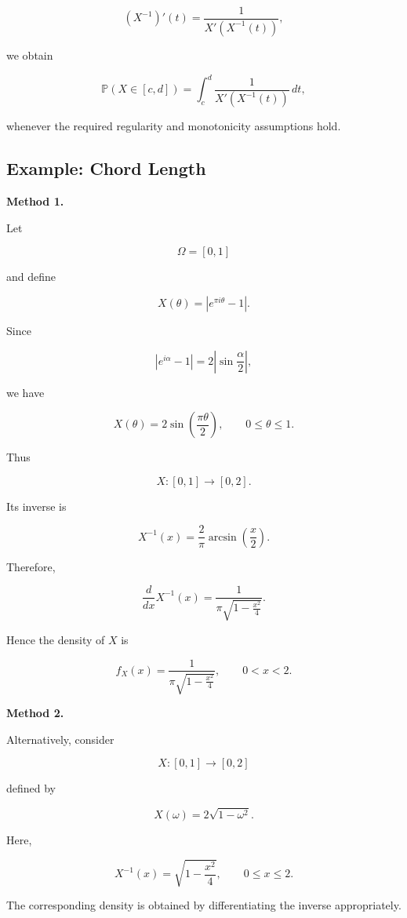 \[
(X^{-1})'(t)
=
\frac{1}{X'(X^{-1}(t))},
\]

we obtain

\[
\mathbb{P}(X\in[c,d])
=
\int_c^d
\frac{1}
{X'(X^{-1}(t))}
\,dt,
\]

whenever the required regularity and monotonicity assumptions hold.

\subsection{Example: Chord Length}

\textbf{Method 1.}

Let

\[
\Omega=[0,1]
\]

and define

\[
X(\theta)
=
\left|
e^{\pi i\theta}-1
\right|.
\]

Since

\[
\left|e^{i\alpha}-1\right|
=
2\left|\sin\frac{\alpha}{2}\right|,
\]

we have

\[
X(\theta)
=
2\sin\left(\frac{\pi\theta}{2}\right),
\qquad
0\leq\theta\leq1.
\]

Thus

\[
X:[0,1]\longrightarrow[0,2].
\]

Its inverse is

\[
X^{-1}(x)
=
\frac{2}{\pi}
\arcsin\left(\frac{x}{2}\right).
\]

Therefore,

\[
\frac{d}{dx}X^{-1}(x)
=
\frac{1}
{\pi\sqrt{1-\frac{x^2}{4}}}.
\]

Hence the density of $X$ is

\[
f_X(x)
=
\frac{1}
{\pi\sqrt{1-\frac{x^2}{4}}},
\qquad
0<x<2.
\]


\textbf{Method 2.}

Alternatively, consider

\[
X:[0,1]\longrightarrow[0,2]
\]

defined by

\[
X(\omega)
=
2\sqrt{1-\omega^2}.
\]

Here,

\[
X^{-1}(x)
=
\sqrt{1-\frac{x^2}{4}},
\qquad
0\leq x\leq2.
\]

The corresponding density is obtained by differentiating the inverse
appropriately.


